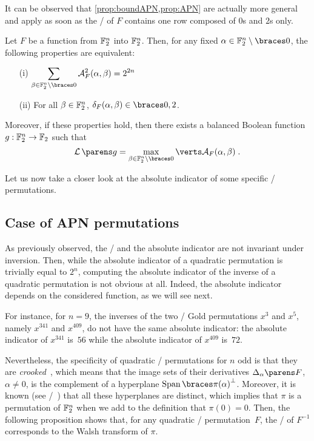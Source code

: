 It can be observed that \cref{prop:boundAPN,prop:APN} are actually more general and apply as soon as the \DDT/ of $F$ contains one row composed of $0$s and $2$s only.
\begin{proposition}
    Let $F$ be a function from $\mathbb{F}_2^n$ into $\mathbb{F}_2^n$.
    Then, for any fixed $\alpha \in \F_2^n \setminus \set{0}$, the following properties are equivalent:
    \begin{enumerate}
        \item[(i)] $\displaystyle \sum_{\beta \in \F_2^n \setminus \set{0}} \AC{F}^2(\alpha, \beta) = 2^{2n}$
        \item[(ii)] For all $\beta \in \mathbb{F}_2^n$, $\DC{F}(\alpha, \beta) \in \set{0,2}$.
    \end{enumerate}
    Moreover, if these properties hold, then there exists a balanced Boolean function $g: \mathbb{F}_2^n \rightarrow \mathbb{F}_2$ such that
    \begin{equation*}
        \linearity{g} = \max_{\beta \in \F_2^n \setminus \set{0}} \abs{\AC{F}(\alpha, \beta)}\;.
    \end{equation*}
\end{proposition}

Let us now take a closer look at the absolute indicator of some specific \APN/ permutations.

\subsection{Case of APN permutations}\label{sec:APN}

As previously observed, the \ACT/ and the absolute indicator are not invariant under inversion.
Then, while the absolute indicator of a quadratic permutation is trivially equal to $2^{n}$, computing the absolute indicator of the inverse of a quadratic permutation is not obvious at all.
Indeed, the absolute indicator depends on the considered function, as we will see next.

For instance, for $n=9$, the inverses of the two \APN/ Gold permutations $x^3$ and $x^5$, namely $x^{341}$ and $x^{409}$, do not have the same absolute indicator: the absolute indicator of $x^{341}$ is~$56$ while the absolute indicator of $x^{409}$ is~$72$.

Nevertheless, the specificity of quadratic \APN/ permutations for $n$ odd is that they are \emph{crooked}~\cite{EJC:BenFon98}, which means that the image sets of their derivatives $\derive{\alpha}{F}$, $\alpha \neq 0$, is the complement of a hyperplane $\Span{\pi(\alpha)}^\perp$.
Moreover, it is known (see \eg/~\cite[Proof of Lemma~5]{TIT:CanCha03}) that all these hyperplanes are distinct, which implies that $\pi$ is a permutation of $\mathbb{F}_2^n$ when we add to the definition that $\pi(0)=0$.
Then, the following proposition shows that, for any quadratic \APN/ permutation~$F$, the \ACT/ of $F^{-1}$ corresponds to the Walsh transform of $\pi$.

